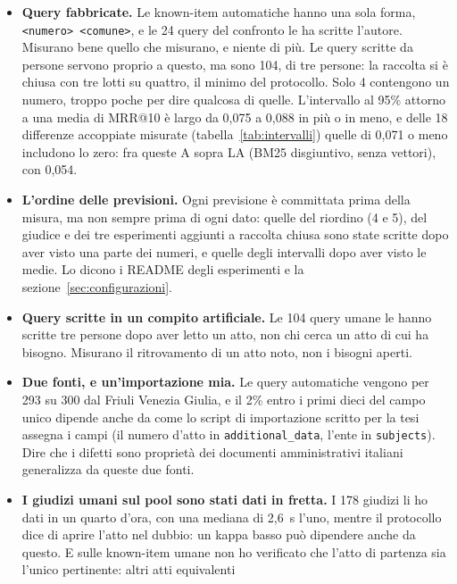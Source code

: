 \begin{itemize}
  \item \textbf{Query fabbricate.} Le known-item automatiche hanno una sola forma,
        \texttt{<numero> <comune>}, e le 24 query del confronto le ha scritte
        l'autore. Misurano bene quello che misurano, e niente di più. Le query
        scritte da persone servono proprio a questo, ma sono 104, di tre
        persone: la raccolta si è chiusa con tre lotti su quattro, il minimo
        del protocollo. Solo 4 contengono un numero, troppo poche per dire
        qualcosa di quelle. L'intervallo al 95\% attorno a una media di MRR@10 è
        largo da 0,075 a 0,088 in più o in meno, e delle 18 differenze accoppiate
        misurate (tabella~\ref{tab:intervalli}) quelle di 0,071 o meno includono
        lo zero: fra queste A sopra LA (BM25 disgiuntivo, senza vettori), con 0,054.
  \item \textbf{L'ordine delle previsioni.} Ogni previsione è committata prima
        della misura, ma non sempre prima di ogni dato: quelle del riordino (4 e
        5), del giudice e dei tre esperimenti aggiunti a raccolta chiusa sono
        state scritte dopo aver visto una parte dei numeri, e quelle degli
        intervalli dopo aver visto le medie. Lo dicono i README degli
        esperimenti e la sezione~\ref{sec:configurazioni}.
  \item \textbf{Query scritte in un compito artificiale.} Le 104 query umane le
        hanno scritte tre persone dopo aver letto un atto, non chi cerca un atto
        di cui ha bisogno. Misurano il ritrovamento di un atto noto, non i
        bisogni aperti.
  \item \textbf{Due fonti, e un'importazione mia.} Le query automatiche vengono per
        293 su 300 dal Friuli Venezia Giulia, e il 2\% entro i primi dieci del
        campo unico dipende anche da come lo script di importazione scritto per la
        tesi assegna i campi (il numero d'atto in \texttt{additional\_data}, l'ente
        in \texttt{subjects}). Dire che i difetti sono proprietà dei documenti
        amministrativi italiani generalizza da queste due fonti.
  \item \textbf{I giudizi umani sul pool sono stati dati in fretta.} I 178
        giudizi li ho dati in un quarto d'ora, con una mediana di 2,6~s l'uno,
        mentre il protocollo dice di aprire l'atto nel dubbio: un kappa basso può
        dipendere anche da questo. E sulle known-item umane non ho verificato che
        l'atto di partenza sia l'unico pertinente: altri atti equivalenti

\end{itemize}
